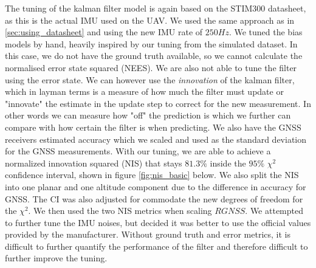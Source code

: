 The tuning of the kalman filter model is again based on the STIM300 datasheet, as this is the actual IMU used on the UAV. We used the same approach as in \cref{sec:using_datasheet} and using the new IMU rate of $250Hz$. We tuned the bias models by hand, heavily inspired by our tuning from the simulated dataset. In this case, we do not have the ground truth available, so we cannot calculate the normalised error state squared (NEES). We are also not able to tune the filter using the error state. We can however use the \textit{innovation} of the kalman filter, which in layman terms is a measure of how much the filter must update or "innovate" the estimate in the update step to correct for the new measurement. In other words we can measure how "off" the prediction is which we further can compare with how certain the filter is when predicting. We also have the GNSS receivers estimated accuracy which we scaled and used as the standard deviation for the GNSS measurements. With our tuning, we are able to achieve a normalized innovation squared (NIS) that stays $81.3\%$ inside the $95\%$ $\chi^2$ confidence interval, shown in figure \ref{fig:nis_basic} below. We also split the NIS into one planar and one altitude component due to the difference in accuracy for GNSS. The CI was also adjusted for commodate the new degrees of freedom for the $\chi^2$. We then used the two NIS metrics when scaling $RGNSS$. We attempted to further tune the IMU noises, but decided it was better to use the official values provided by the manufacturer. Without ground truth and error metrics, it is difficult to further quantify the performance of the filter and therefore difficult to further improve the tuning. 

